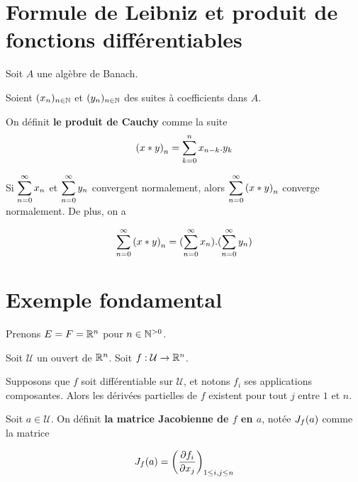 \section{Formule de Leibniz et produit de fonctions différentiables}

\begin{definition}
	Soit $A$ une algèbre de Banach.

	Soient $(x_{n})_{n \in \mathbb{N}}$ et $(y_{n})_{n \in \mathbb{N}}$ des
	suites à coefficients dans $A$.

	On définit \textbf{le produit de Cauchy} comme la suite
	\begin{equation*}
		{(x \ast y)}_{n} =
		\displaystyle \sum_{k = 0}^{n} x_{n - k} . y_{k}
	\end{equation*}
\end{definition}

\begin{theorem}
	\label{theorem_cauchy_mertens}
	Si $\displaystyle \sum_{n = 0}^{\infty} x_{n}$ et $\displaystyle \sum_{n = 0}^{\infty} y_{n}$ convergent
	normalement, alors $\displaystyle \sum_{n = 0}^{\infty} {(x \ast y)}_{n}$ converge normalement.
	De plus, on a

	\begin{equation*}
		\displaystyle \sum_{n = 0}^{\infty} {(x \ast y)}_{n} =
		(\displaystyle \sum_{n = 0}^{\infty} x_{n}) . (\displaystyle \sum_{n = 0}^{\infty} y_{n})
	\end{equation*}
\end{theorem}

\section{Exemple fondamental}


Prenons $E = F = \mathbb{R}^{n}$ pour $n \in \mathbb{N}^{> 0}$.

Soit $\mathcal{U}$ un ouvert de $\mathbb{R}^{n}$.
Soit $f : \mathcal{U} \rightarrow \mathbb{R}^{n}$.

Supposons que $f$ soit différentiable sur $\mathcal{U}$, et notons $f_{i}$ ses
applications composantes. Alors les dérivées partielles de $f$ existent pour
tout $j$ entre $1$ et $n$.

\begin{definition}
	Soit $a \in \mathcal{U}$.
	On définit \textbf{la matrice Jacobienne de $f$ en $a$}, notée
	$J_{f}(a)$ comme la matrice

	\begin{equation*}
		J_{f}(a) = \left(\pdv{f_{i}}{x_{j}} (a) \right)_{1 \leq i, j \leq n}
	\end{equation*}
\end{definition}
